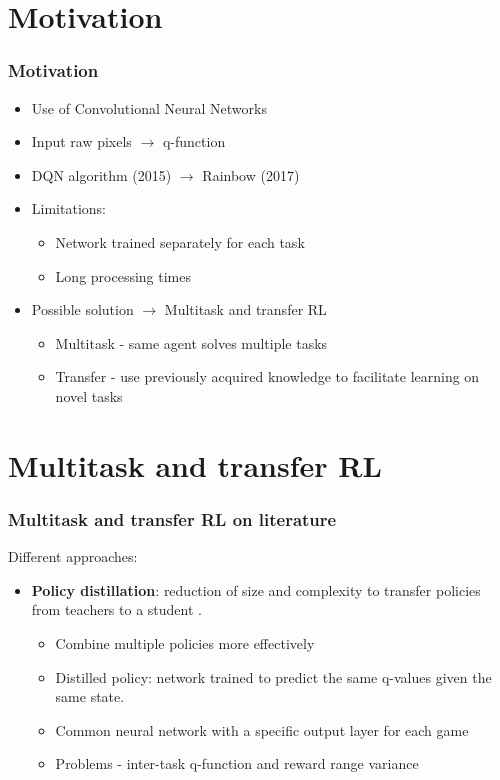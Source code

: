 \documentclass{beamer}
\theoremstyle{remark}
\theoremstyle{plain}
\begin{document}
\section{Motivation}
\label{sec:motivation}
\begin{frame}
  \frametitle{Motivation}
\begin{itemize}
    \item Use of Convolutional Neural Networks
    \item Input raw pixels $\xrightarrow{}$ q-function
    \item DQN algorithm (2015) $\xrightarrow{}$ Rainbow (2017)
    \item Limitations:
    \begin{itemize}
        \item Network trained separately for each task
        \item Long processing times
    \end{itemize}
    \item Possible solution $\xrightarrow{}$ Multitask and transfer RL
    \begin{itemize}
        \item Multitask - same agent solves multiple tasks
        \item Transfer - use previously acquired knowledge to facilitate learning on novel tasks
    \end{itemize}
\end{itemize}




\end{frame}

\section{Multitask and transfer RL}
\label{sec:multi}
\begin{frame}
  \frametitle{Multitask and transfer RL on literature}
Different approaches:\\
\vspace{1cm}
\begin{itemize}
    \item \textbf{Policy distillation}: reduction of size and complexity to transfer policies from teachers to a student \cite{RusuPOLICYDISTILLATION}.
    \begin{itemize}
        \item Combine multiple policies more effectively
        \item Distilled policy: network trained to predict the same q-values given the same state.
        \item Common neural network with a specific output layer for each game
        \item Problems - inter-task q-function and reward range variance
    \end{itemize} 
\end{itemize}
 \end{frame}
 
\end{document}
